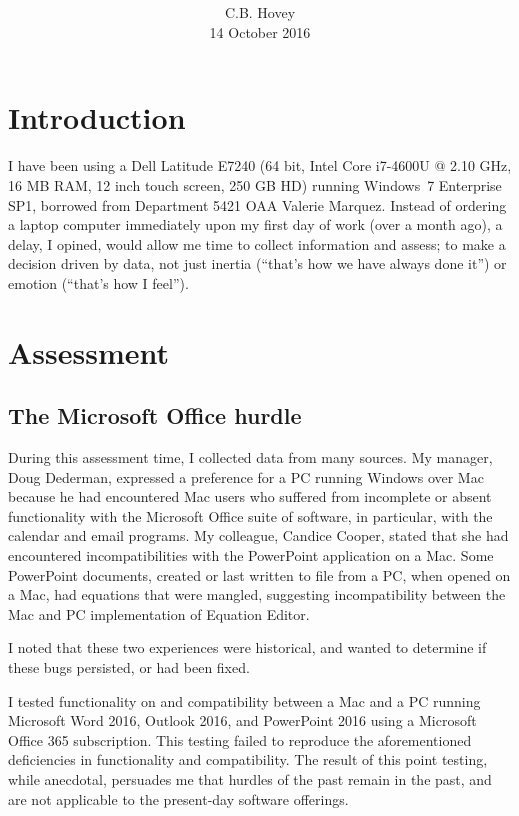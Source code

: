 \documentclass[10pt,twocolumn,reqno]{amsart}
\title{\bfseries \cbhTitle}
\author{C.B. Hovey \\ \tiny 14 October 2016}
\begin{document}

\maketitle


\section{Introduction}
I have been using a Dell Latitude E7240 (64 bit, Intel Core i7-4600U @ 2.10 GHz, 16 MB RAM, 12 inch touch screen, 250 GB HD) running Windows~7 Enterprise SP1, borrowed from Department 5421 OAA Valerie Marquez.  Instead of ordering a laptop computer immediately upon my first day of work 
(over a month ago), a delay, I opined, would allow me time to collect information and assess; to make a decision driven by data, not just inertia (``that's how we have always done it'') or emotion (``that's how I feel'').  

\section{Assessment}
\subsection{The Microsoft Office hurdle}

During this assessment time, I collected data from many sources.  
My manager, Doug Dederman, expressed a preference for a PC 
running Windows over Mac because he had encountered Mac users 
who suffered from incomplete or absent functionality with the 
Microsoft Office suite of software, in particular, with the 
calendar and email programs.  
My colleague, Candice Cooper, stated that she had encountered 
incompatibilities with the PowerPoint application on a Mac.  
Some PowerPoint documents, created or last written to file from a PC, 
when opened on a Mac, had equations that were mangled, 
suggesting incompatibility between the Mac and PC implementation
of Equation Editor.

I noted that these two experiences were historical, and wanted to
determine if these bugs persisted, or had been fixed.

I tested functionality on and compatibility between a Mac and 
a PC running Microsoft Word 2016, Outlook 2016, and PowerPoint 2016 
using a Microsoft Office 365 subscription.  
This testing failed to reproduce the aforementioned 
deficiencies in functionality and compatibility.  
The result of this point testing, while anecdotal, 
persuades me that hurdles of the past remain in the past, 
and are not applicable to the present-day software offerings.  
\end{document}
